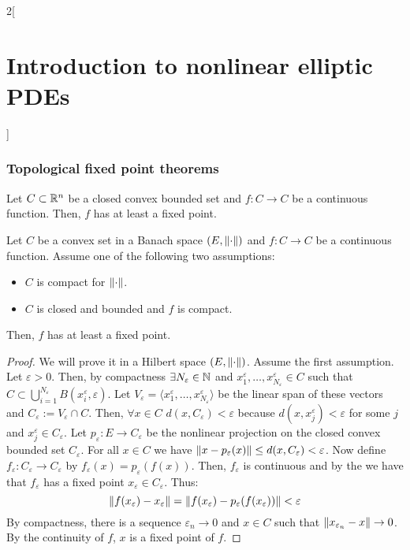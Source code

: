 \documentclass[../../../main_math.tex]{subfiles}
\begin{document}
\begin{multicols}{2}[\section{Introduction to nonlinear elliptic PDEs}]
  \subsubsection{Topological fixed point theorems}
  \begin{theorem}
    Let $C\subset \mathbb{R}^n$ be a closed convex bounded set and $f:C\to C$ be a continuous function. Then, $f$ has at least a fixed point.
  \end{theorem}
  \begin{theorem}\label{INEPDE:schauder_fixed_point}
    Let $C$ be a convex set in a Banach space $(E,\left\|\cdot\right\|)$ and $f:C\to C$ be a continuous function. Assume one of the following two assumptions:
    \begin{itemize}
      \item $C$ is compact for $\left\|\cdot\right\|$.
      \item $C$ is closed and bounded and $f$ is compact.
    \end{itemize}
    Then, $f$ has at least a fixed point.
  \end{theorem}
  \begin{proof}
    We will prove it in a Hilbert space $(E,\left\|\cdot\right\|)$. Assume the first assumption. Let $\varepsilon>0$. Then, by compactness $\exists N_\varepsilon\in\mathbb{N}$ and $x_1^\varepsilon,\dots,x_{N_\varepsilon}^\varepsilon\in C$ such that $C\subset \bigcup_{i=1}^{N_\varepsilon}B(x_i^\varepsilon,\varepsilon)$. Let $V_\varepsilon=\langle x_1^\varepsilon,\dots,x_{N_\varepsilon}^\varepsilon\rangle$ be the linear span of these vectors and $C_\varepsilon:=V_\varepsilon\cap C$. Then, $\forall x\in C$ $d(x,C_\varepsilon)< \varepsilon$ because $d(x,x_j^\varepsilon)<\varepsilon$ for some $j$ and $x_j^\varepsilon\in C_\varepsilon$. Let $p_\varepsilon:E\to C_\varepsilon$ be the nonlinear projection on the closed convex bounded set $C_\varepsilon$. For all $x\in C$ we have $\left\|x-p_\varepsilon(x)\right\|\leq d(x,C_\varepsilon)<\varepsilon$. Now define $f_\varepsilon:C_\varepsilon\to C_\varepsilon$ by $f_\varepsilon(x)=p_\varepsilon(f(x))$. Then, $f_\varepsilon$ is continuous and by the  we have that $f_\varepsilon$ has a fixed point $x_\varepsilon\in C_\varepsilon$. Thus:
    $$
      \left\|f(x_\varepsilon)-x_\varepsilon\right\|=\left\|f(x_\varepsilon)-p_\varepsilon(f(x_\varepsilon))\right\|<\varepsilon
    $$
    By compactness, there is a sequence $\varepsilon_n\to 0$ and $x\in C$ such that $\left\|x_{\varepsilon_n}-x\right\|\to 0$. By the continuity of $f$, $x$ is a fixed point of $f$.


\end{proof}
\end{multicols}
\end{document}

